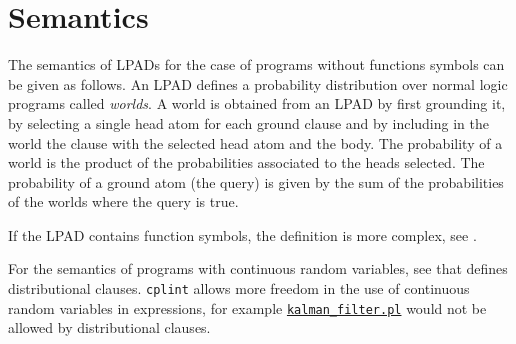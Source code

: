 \section{Semantics}
\label{semantics}

The semantics of LPADs for the case of programs without functions symbols can be given
as follows. An LPAD defines a probability distribution over normal logic programs called
\emph{worlds}. A world is obtained from an LPAD by first grounding it, by 
selecting a single head atom for each ground clause and by including in the world
the clause with the selected head atom and the body.
The probability of a world is the product of the probabilities associated to the 
heads selected.
The probability of a ground atom (the query) is given by the sum of the probabilities
of the worlds where the query is true.

If the LPAD contains function symbols, the definition is more complex, see
\cite{DBLP:journals/ai/Poole97,DBLP:journals/jair/SatoK01,Rig15-PLP-IW}.

For the semantics of programs with continuous random variables, see \cite{Nitti2016} that defines distributional clauses.
\verb|cplint| allows more freedom in the use of continuous random variables
in expressions, for example
\href{http://cplint.lamping.unife.it/example/inference/kalman_filter.pl}{\texttt{kalman\_filter.pl}} would not be allowed by distributional clauses.

